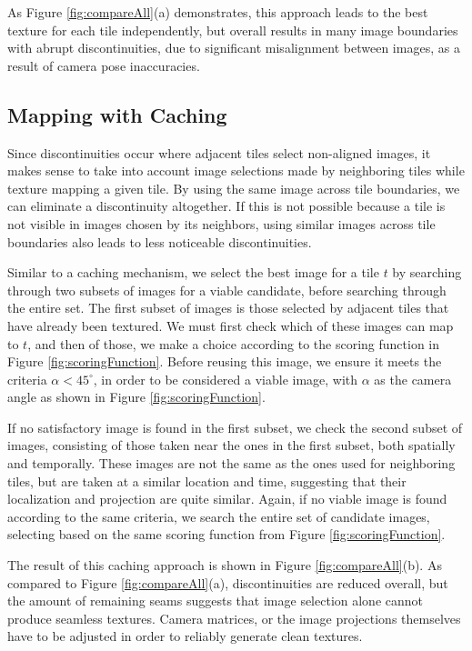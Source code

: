 \documentclass[10pt,twocolumn,letterpaper]{article}
\begin{document}
As Figure \ref{fig:compareAll}(a) demonstrates, this approach leads to
the best texture for each tile independently, but overall results in
many image boundaries with abrupt discontinuities, due to significant
misalignment between images, as a result of camera pose inaccuracies.

\subsection{Mapping with Caching}
\label{sec:mappingWithCaching}
Since discontinuities occur where adjacent tiles select non-aligned
images, it makes sense to take into account image selections made by
neighboring tiles while texture mapping a given tile. By using the
same image across tile boundaries, we can eliminate a discontinuity
altogether. If this is not possible because a tile is not visible in
images chosen by its neighbors, using similar images across tile
boundaries also leads to less noticeable discontinuities.

Similar to a caching mechanism, we select the best image for a tile
$t$ by searching through two subsets of images for a viable candidate,
before searching through the entire set. The first subset of images is
those selected by adjacent tiles that have already been textured. We
must first check which of these images can map to $t$, and then of
those, we make a choice according to the scoring function in Figure
\ref{fig:scoringFunction}. Before reusing this image, we ensure it
meets the criteria $\alpha < 45^\circ$, in order to be considered a
viable image, with $\alpha$ as the camera angle as shown in Figure
\ref{fig:scoringFunction}.

If no satisfactory image is found in the first subset, we check the
second subset of images, consisting of those taken near the ones in
the first subset, both spatially and temporally. These images are not
the same as the ones used for neighboring tiles, but are taken at a
similar location and time, suggesting that their localization and
projection are quite similar. Again, if no viable image is found
according to the same criteria, we search the entire set of candidate
images, selecting based on the same scoring function from Figure
\ref{fig:scoringFunction}.

The result of this caching approach is shown in Figure
\ref{fig:compareAll}(b). As compared to Figure
\ref{fig:compareAll}(a), discontinuities are reduced overall, but the
amount of remaining seams suggests that image selection alone cannot
produce seamless textures. Camera matrices, or the image projections
themselves have to be adjusted in order to reliably generate clean
textures.
\end{document}
